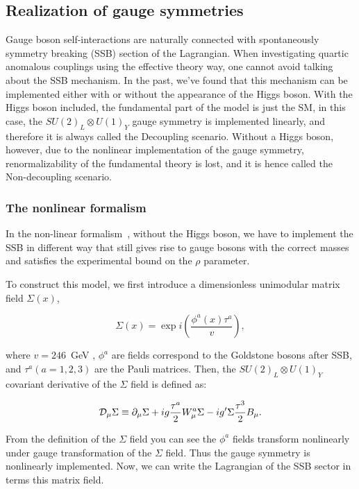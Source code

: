 \subsection{Realization of gauge symmetries}

Gauge boson self-interactions are naturally connected with
spontaneously symmetry breaking (SSB) section of the Lagrangian. When
investigating quartic anomalous couplings using the effective theory
way, one cannot avoid talking about the SSB mechanism. In the past,
we've found that this mechanism can be implemented either with or
without the appearance of the Higgs boson. With the Higgs boson
included, the fundamental part of the model is just the SM, in this
case, the $SU(2)_L \otimes U(1)_Y$ gauge symmetry is implemented
linearly, and therefore it is always called the Decoupling
scenario. Without a Higgs boson, however, due to the nonlinear
implementation of the gauge symmetry, renormalizability of the
fundamental theory is lost, and it is hence called the Non-decoupling
scenario.

\subsubsection{The nonlinear formalism}

In the non-linear formalism~\cite{Belanger:1999,Bosonic:2004PRD},
without the Higgs boson, we have to implement the SSB in different way
that still gives rise to gauge bosons with the correct masses and
satisfies the experimental bound on the $\rho$ parameter.

To construct this model, we first introduce a dimensionless unimodular matrix field $\Sigma(x)$,

\begin{equation}
\Sigma(x) = \exp{i(\frac{\phi^{a}(x)\tau^{a}}{v})} ,
\end{equation}

where $v = 246$~GeV , $\phi^a$ are fields correspond to the Goldstone
bosons after SSB, and $\tau^a (a=1,2,3)$ are the Pauli matrices.
Then, the $SU(2)_L \otimes U(1)_Y$ covariant derivative of the
$\Sigma$ field is defined as:

\begin{equation}
{\cal D}_{\mu}\Sigma \equiv \partial_{\mu}\Sigma + i g \frac{\tau^a}{2} W_{\mu}^a \Sigma - i g' \Sigma \frac{\tau^3}{2} B_{\mu} .
\end{equation}

From the definition of the $\Sigma$ field you can see the $\phi^a$
fields transform nonlinearly under gauge transformation of the
$\Sigma$ field. Thus the gauge symmetry is nonlinearly
implemented. Now, we can write the Lagrangian of the SSB sector in
terms this matrix field.

